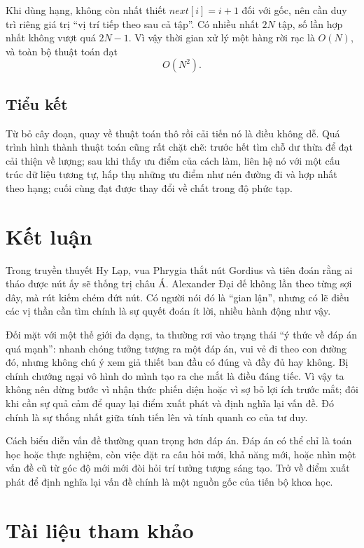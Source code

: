 \documentclass[11pt]{article}
\begin{document}
Khi dùng hạng, không còn nhất thiết \(\mathit{next}[i]=i+1\) đối với gốc, nên
cần duy trì riêng giá trị ``vị trí tiếp theo sau cả tập''. Có nhiều nhất
\(2N\) tập, số lần hợp nhất không vượt quá \(2N-1\). Vì vậy thời gian xử lý
một hàng rời rạc là \(O(N)\), và toàn bộ thuật toán đạt
\[
  O(N^2).
\]

\subsection{Tiểu kết}

Từ bỏ cây đoạn, quay về thuật toán thô rồi cải tiến nó là điều không dễ. Quá
trình hình thành thuật toán cũng rất chặt chẽ: trước hết tìm chỗ dư thừa để
đạt cải thiện về lượng; sau khi thấy ưu điểm của cách làm, liên hệ nó với một
cấu trúc dữ liệu tương tự, hấp thụ những ưu điểm như nén đường đi và hợp nhất
theo hạng; cuối cùng đạt được thay đổi về chất trong độ phức tạp.

\section{Kết luận}

Trong truyền thuyết Hy Lạp, vua Phrygia thắt nút Gordius và tiên đoán rằng ai
tháo được nút ấy sẽ thống trị châu Á. Alexander Đại đế không lần theo từng
sợi dây, mà rút kiếm chém đứt nút. Có người nói đó là ``gian lận'', nhưng có
lẽ điều các vị thần cần tìm chính là sự quyết đoán ít lời, nhiều hành động
như vậy.

Đối mặt với một thế giới đa dạng, ta thường rơi vào trạng thái ``ý thức về
đáp án quá mạnh'': nhanh chóng tưởng tượng ra một đáp án, vui vẻ đi theo con
đường đó, nhưng không chú ý xem giả thiết ban đầu có đúng và đầy đủ hay không.
Bị chính chướng ngại vô hình do mình tạo ra che mắt là điều đáng tiếc. Vì vậy
ta không nên dừng bước vì nhận thức phiến diện hoặc vì sợ bỏ lợi ích trước
mắt; đôi khi cần sự quả cảm để quay lại điểm xuất phát và định nghĩa lại vấn
đề. Đó chính là sự thống nhất giữa tính tiến lên và tính quanh co của tư duy.

Cách biểu diễn vấn đề thường quan trọng hơn đáp án. Đáp án có thể chỉ là toán
học hoặc thực nghiệm, còn việc đặt ra câu hỏi mới, khả năng mới, hoặc nhìn
một vấn đề cũ từ góc độ mới mới đòi hỏi trí tưởng tượng sáng tạo. Trở về điểm
xuất phát để định nghĩa lại vấn đề chính là một nguồn gốc của tiến bộ khoa
học.

\section*{Tài liệu tham khảo}
\end{document}
